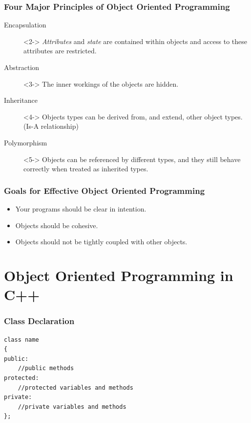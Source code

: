 \documentclass[handout]{beamer}
\begin{document}
\begin{frame}
   \frametitle{Four Major Principles of Object Oriented Programming}
   \begin{description}
   \item[Encapsulation]<2-> {\em Attributes} and {\em state} are contained 
     within objects and access to these attributes are restricted.
   \item[Abstraction]<3-> The inner workings of the objects are hidden.
   \item[Inheritance]<4-> Objects types can be derived from, and extend,
     other object types.  (Is-A relationship)
   \item[Polymorphism]<5-> Objects can be referenced by different types, 
     and they still behave correctly when treated as inherited types.
   \end{description}
\end{frame}

\begin{frame}
   \frametitle{Goals for Effective Object Oriented Programming}
   \begin{itemize}
   \item<2-> Your programs should be clear in intention.
   \item<3-> Objects should be cohesive.
   \item<4-> Objects should not be tightly coupled with other objects.
   \end{itemize}
\end{frame}

\section{Object Oriented Programming in C++}
\begin{frame}[fragile]
   \frametitle{Class Declaration}
   \begin{verbatim}
class name 
{
public:
    //public methods
protected:
    //protected variables and methods
private:
    //private variables and methods
}; 
   \end{verbatim}
\end{frame}
\end{document}
